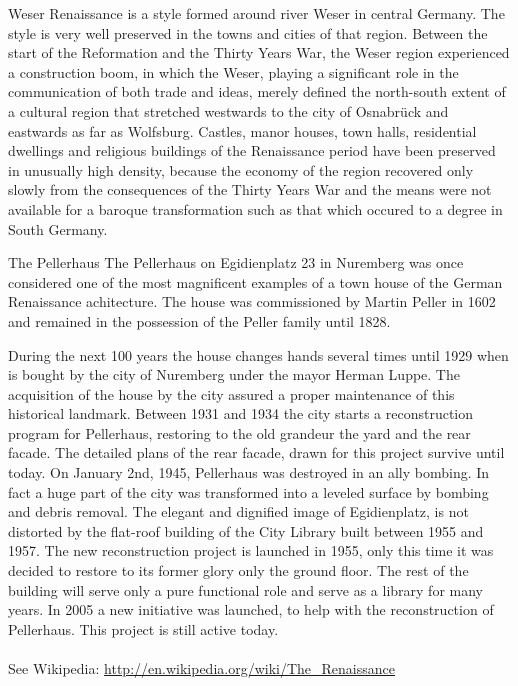 Weser Renaissance is a style formed around river Weser in central Germany. The style is very well preserved in the towns and cities of that region. 
Between the start of the Reformation and the Thirty Years War, the Weser region experienced a construction boom, in which the Weser, playing a significant role in the communication of both trade and ideas, merely defined the north-south extent of a cultural region that stretched westwards to the city of Osnabrück and eastwards as far as Wolfsburg.
Castles, manor houses, town halls, residential dwellings and religious buildings of the Renaissance period have been preserved in unusually high density, because the economy of the region recovered only slowly from the consequences of the Thirty Years War and the means were not available for a baroque transformation such as that which occured to a degree in South Germany.

The Pellerhaus
The Pellerhaus on Egidienplatz 23 in Nuremberg was once considered one of the most magnificent examples of a town house of the German Renaissance achitecture.
The house was commissioned by Martin Peller in 1602 and remained in the possession of the Peller family until 1828. 

During the next 100 years the house changes hands several times until 1929 when is bought by the city of Nuremberg under the mayor Herman Luppe. The acquisition of the house by the city assured a proper maintenance of this historical landmark.
Between 1931 and 1934 the city starts a reconstruction program for Pellerhaus, restoring to the old grandeur the yard and the rear facade. The detailed plans of the rear facade, drawn for this project survive until today.
On January 2nd, 1945, Pellerhaus was destroyed in an ally bombing. In fact a huge part of the city was transformed into a leveled surface by bombing and debris removal. 
The elegant and dignified image of Egidienplatz, is not distorted by the flat-roof building of the City Library built between 1955 and 1957. The new reconstruction project is launched in 1955, only this time it was decided to restore to its former glory only the ground floor. The rest of the building will serve only a pure functional role and serve as a library for many years.
In 2005 a new initiative was launched, to help with the reconstruction of Pellerhaus. This project is still active today.\\
\\

See Wikipedia: \url{http://en.wikipedia.org/wiki/The_Renaissance} 


